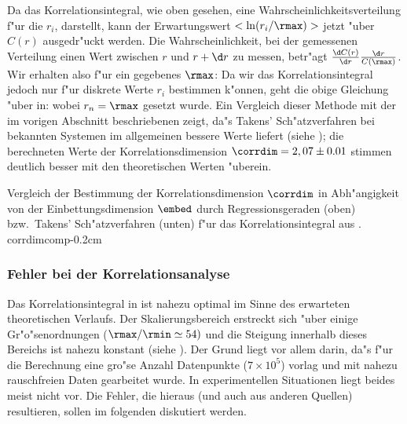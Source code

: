 Da das Korrelationsintegral, wie oben gesehen, eine Wahrscheinlichkeitsverteilung f"ur die
$r_i$, darstellt, kann der Erwartungswert $<\ln (r_i/\rmax)>$ jetzt "uber $C(r)$ ausgedr"uckt
werden. Die Wahrscheinlichkeit, bei der gemessenen Verteilung einen Wert zwischen $r$ und
$r+\d r$ zu messen, betr"agt $\frac{\d  C(r)}{\d r}\frac{\d r}{C(\rmax)}$. Wir erhalten
also f"ur ein gegebenes $\rmax$:
Da wir das Korrelationsintegral jedoch nur f"ur diskrete Werte $r_i$ bestimmen k"onnen,
geht die obige Gleichung "uber in:
wobei $r_n=\rmax$ gesetzt wurde.  Ein Vergleich dieser Methode mit der im vorigen
Abschnitt beschriebenen zeigt, da"s Takens' Sch"atzverfahren bei bekannten Systemen im
allgemeinen bessere Werte liefert (siehe ); die berechneten Werte der
Korrelationsdimension $\corrdim=2,07\pm0.01$ stimmen deutlich besser mit den theoretischen
Werten "uberein.

 { Vergleich der
  Bestimmung der Korrelationsdimension $\corrdim$ in Abh"angigkeit von der
  Einbettungsdimension $\embed$ durch Regressionsgeraden (oben) bzw.\ Takens' Sch"atzverfahren
  (unten) f"ur das Korrelationsintegral aus . 
}  {corrdimcomp}{-0.2cm}

\subsubsection{Fehler bei der Korrelationsanalyse}
Das Korrelationsintegral in  ist nahezu optimal im Sinne des erwarteten 
theoretischen Verlaufs. Der Skalierungsbereich 
erstreckt sich "uber einige Gr"o"senordnungen ($\rmax/\rmin\simeq 54)$ und die Steigung innerhalb
dieses Bereichs ist nahezu konstant (siehe ). Der Grund liegt vor allem
darin, da"s f"ur die Berechnung eine gro"se Anzahl Datenpunkte ($7\times10^5$) vorlag und
mit nahezu rauschfreien Daten gearbeitet wurde. In experimentellen Situationen liegt
beides meist nicht vor. Die Fehler, die hieraus (und auch aus anderen Quellen) resultieren,
sollen im folgenden diskutiert werden.




